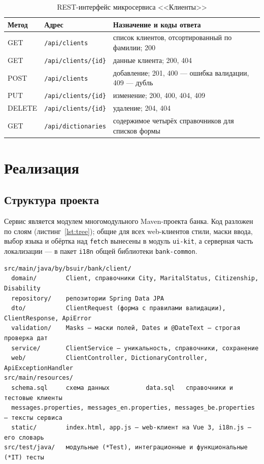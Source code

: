 \documentclass[14pt,a4paper]{extarticle}
\begin{document}
\begin{table}[H]
\caption{REST-интерфейс микросервиса <<Клиенты>>}
\label{tab:rest}
\centering
\small
\begin{tabularx}{\textwidth}{llX}
\toprule
Метод & Адрес & Назначение и коды ответа \\
\midrule
GET & \texttt{/api/clients} & список клиентов, отсортированный по фамилии; 200 \\
GET & \texttt{/api/clients/\{id\}} & данные клиента; 200, 404 \\
POST & \texttt{/api/clients} & добавление; 201, 400 --- ошибка валидации, 409 --- дубль \\
PUT & \texttt{/api/clients/\{id\}} & изменение; 200, 400, 404, 409 \\
DELETE & \texttt{/api/clients/\{id\}} & удаление; 204, 404 \\
GET & \texttt{/api/dictionaries} & содержимое четырёх справочников для списков формы \\
\bottomrule
\end{tabularx}
\end{table}

\section{Реализация}

\subsection{Структура проекта}

Сервис является модулем многомодульного Maven-проекта банка. Код разложен по слоям
(листинг~\ref{lst:tree}); общие для всех web-клиентов стили, маски ввода, выбор языка и
обёртка над \texttt{fetch} вынесены в модуль \texttt{ui-kit}, а серверная часть локализации
--- в пакет \texttt{i18n} общей библиотеки \texttt{bank-common}.

\begin{Verbatim}[fontsize=\footnotesize, frame=single, rulecolor=\color{codeframe}]
src/main/java/by/bsuir/bank/client/
  domain/        Client, справочники City, MaritalStatus, Citizenship, Disability
  repository/    репозитории Spring Data JPA
  dto/           ClientRequest (форма с правилами валидации), ClientResponse, ApiError
  validation/    Masks — маски полей, Dates и @DateText — строгая проверка дат
  service/       ClientService — уникальность, справочники, сохранение
  web/           ClientController, DictionaryController, ApiExceptionHandler
src/main/resources/
  schema.sql     схема данных          data.sql   справочники и тестовые клиенты
  messages.properties, messages_en.properties, messages_be.properties — тексты сервиса
  static/        index.html, app.js — web-клиент на Vue 3, i18n.js — его словарь
src/test/java/   модульные (*Test), интеграционные и функциональные (*IT) тесты
\end{Verbatim}
\end{document}
